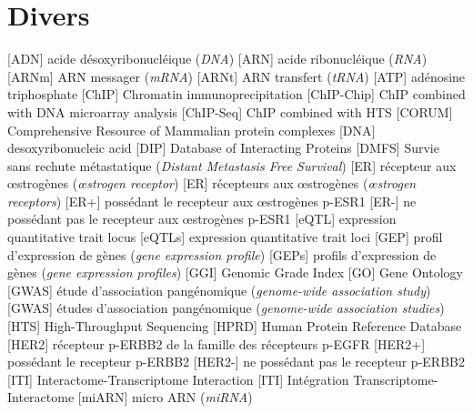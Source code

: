 	\section{\textcolor{white!15!black}{Divers}}
		\begin{acronym}[CDKN2A]
						[ADN]		{acide désoxyribonucléique (\emph{\acs{DNA}})}
						[ARN]		{acide ribonucléique (\emph{\acs{RNA}})}
						[ARNm]		{\acs{ARN} messager (\emph{\acs{mRNA}})}
						[ARNt]		{\acs{ARN} transfert (\emph{\acs{tRNA}})}
						[ATP]		{adénosine triphosphate}
						[ChIP]		{Chromatin immunoprecipitation}
				{\acs{ChIP} combined with DNA microarray analysis}
					[ChIP-Seq]	{\acs{ChIP} combined with \acs{HTS}}
						[CORUM]		{Comprehensive Resource of Mammalian protein complexes}
						[DNA]		{desoxyribonucleic acid}
						[DIP]		{Database of Interacting Proteins}
						[DMFS]		{Survie sans rechute métastatique (\emph{Distant Metastasis Free Survival})}
						[ER]		{récepteur aux {\oe}strogènes (\emph{{\oe}strogen receptor})}
					{récepteurs aux {\oe}strogènes (\emph{{\oe}strogen receptors})}
						[ER+]		{possédant le recepteur aux {\oe}strogènes \acs{p-ESR1}}
						[ER-]		{ne possédant pas le recepteur aux {\oe}strogènes \acs{p-ESR1}}
						[eQTL]		{expression quantitative trait locus}
						[eQTLs]		{expression quantitative trait loci}
						[GEP]		{profil d'expression de gènes (\emph{gene expression profile})}
					{profils d'expression de gènes (\emph{gene expression profiles})}
						[GGI]		{Genomic Grade Index}
						[GO]		{Gene Ontology}
						[GWAS]		{étude d'association pangénomique (\emph{genome-wide association study})}
					{études d'association pangénomique (\emph{genome-wide association studies})}
						[HTS]		{High-Throughput Sequencing}
						[HPRD]		{Human Protein Reference Database}
						[HER2]		{récepteur \acs{p-ERBB2} de la famille des récepteurs \acs{p-EGFR}}
						[HER2+]		{possédant le recepteur \acs{p-ERBB2}}
						[HER2-]		{ne possédant pas le recepteur \acs{p-ERBB2}}
						[ITI]		{Interactome-Transcriptome Interaction}
						[ITI]		{Intégration Transcriptome-Interactome}
						[miARN]		{micro \acs{ARN} (\emph{\ac{miRNA}})}

\end{acronym}
